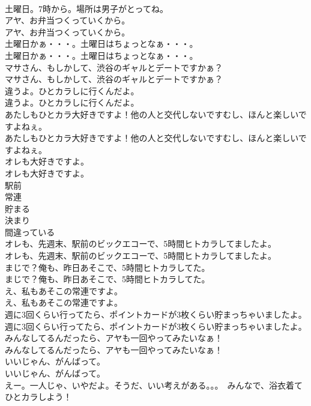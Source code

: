 \documentclass[8pt]{extreport}
\begin{document}
\begin{CJK}{UTF8}{min}
\\	土曜日。7時から。場所は男子がとってね。 
\\	アヤ、お弁当つくっていくから。	
\\	アヤ、お弁当つくっていくから。 
\\	土曜日かぁ・・・。土曜日はちょっとなぁ・・・。	
\\	土曜日かぁ・・・。土曜日はちょっとなぁ・・・。 
\\	マサさん、もしかして、渋谷のギャルとデートですかぁ？	
\\	マサさん、もしかして、渋谷のギャルとデートですかぁ？ 
\\	違うよ。ひとカラしに行くんだよ。	
\\	違うよ。ひとカラしに行くんだよ。 
\\	あたしもひとカラ大好きですよ！他の人と交代しないですむし、ほんと楽しいですよねぇ。	
\\	あたしもひとカラ大好きですよ！他の人と交代しないですむし、ほんと楽しいですよねぇ。 
\\	オレも大好きですよ。	
\\	オレも大好きですよ。 
\\	駅前
\\	常連
\\	貯まる
\\	決まり
\\	間違っている
\\	オレも、先週末、駅前のビックエコーで、5時間ヒトカラしてましたよ。	
\\	オレも、先週末、駅前のビックエコーで、5時間ヒトカラしてましたよ。 
\\	まじで？俺も、昨日あそこで、5時間ヒトカラしてた。	
\\	まじで？俺も、昨日あそこで、5時間ヒトカラしてた。 
\\	え、私もあそこの常連ですよ。	
\\	え、私もあそこの常連ですよ。 
\\	週に3回くらい行ってたら、ポイントカードが3枚くらい貯まっちゃいましたよ。	
\\	週に3回くらい行ってたら、ポイントカードが3枚くらい貯まっちゃいましたよ。 
\\	みんなしてるんだったら、アヤも一回やってみたいなぁ！	
\\	みんなしてるんだったら、アヤも一回やってみたいなぁ！ 
\\	いいじゃん、がんばって。	
\\	いいじゃん、がんばって。 
\\	えー。一人じゃ、いやだよ。そうだ、いい考えがある。。。　みんなで、浴衣着てひとカラしよう！	

\end{CJK}
\end{document}
